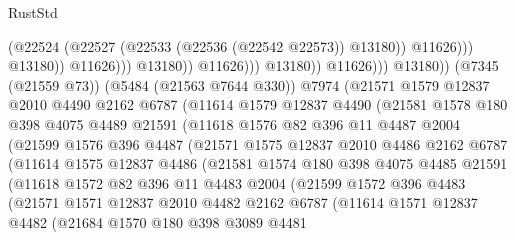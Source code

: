 \begin{lexlean}{RustStd}
\begin{coremodule}
                                              (@22524
                                                (@22527 (@22533 (@22536 (@22542 @22573)) @13180))
                                                @11626)))
                                          @13180))
                                      @11626)))
                                @13180))
                            @11626)))
                      @13180))
                  @11626)))
            @13180))
        (@7345 (@21559 @73))
        (@5484 (@21563 @7644 @330))
        @7974
        (@21571
          @1579
          @12837
          @2010
          @4490
          @2162
          @6787
          (@11614
            @1579
            @12837
            @4490
            (@21581
              @1578
              @180
              @398
              @4075
              @4489
              @21591
              (@11618
                @1576
                @82
                @396
                @11
                @4487
                @2004
                (@21599
                  @1576
                  @396
                  @4487
                  (@21571
                    @1575
                    @12837
                    @2010
                    @4486
                    @2162
                    @6787
                    (@11614
                      @1575
                      @12837
                      @4486
                      (@21581
                        @1574
                        @180
                        @398
                        @4075
                        @4485
                        @21591
                        (@11618
                          @1572
                          @82
                          @396
                          @11
                          @4483
                          @2004
                          (@21599
                            @1572
                            @396
                            @4483
                            (@21571
                              @1571
                              @12837
                              @2010
                              @4482
                              @2162
                              @6787
                              (@11614
                                @1571
                                @12837
                                @4482
                                (@21684
                                  @1570
                                  @180
                                  @398
                                  @3089
                                  @4481

\end{coremodule}
\end{lexlean}
